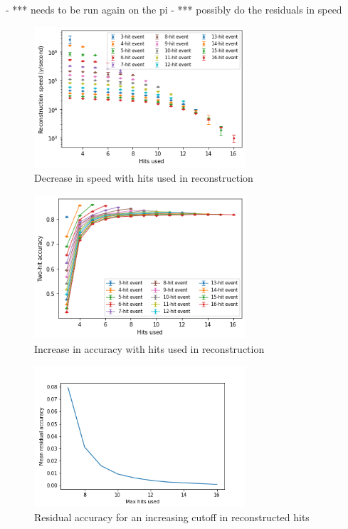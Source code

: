 - *** needs to be run again on the pi
- *** possibly do the residuals in speed

\begin{figure}
    \centering
    \includegraphics[width=0.7\textwidth]{graphs/pi_hits_v_hitsUsed_speed.png}
    \caption{Decrease in speed with hits used in reconstruction}
    \label{fig:hits_v_hitsUsed_speed}
\end{figure}

\begin{figure}
    \centering
    \includegraphics[width=0.7\textwidth]{graphs/pi_hits_v_hitsUsed_accuracy.png}
    \caption{Increase in accuracy with hits used in reconstruction}
    \label{fig:hits_v_hitsUsed_acc}
\end{figure}

\begin{figure}
    \centering
    \includegraphics[width=0.7\textwidth]{graphs/mean_resid_acc.png}
    \caption{Residual accuracy for an increasing cutoff in reconstructed hits}
    \label{fig:hits_v_hitsUsed_resids}
\end{figure}

